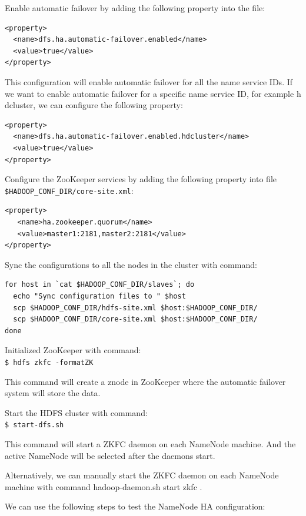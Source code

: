 Enable automatic failover by adding the following property into the file:
\lstset{style=bashstyle}
\begin{lstlisting}
<property>
  <name>dfs.ha.automatic-failover.enabled</name>
  <value>true</value>
</property>
\end{lstlisting}

This configuration will enable automatic failover for all the name service IDs. If we want to enable automatic failover for a specific name service ID, for example h
dcluster, we can configure the following property:
\lstset{style=bashstyle}
\begin{lstlisting}
<property>
  <name>dfs.ha.automatic-failover.enabled.hdcluster</name>
  <value>true</value>
</property>
\end{lstlisting}

Configure the ZooKeeper services by adding the following property into file \verb|$HADOOP_CONF_DIR/core-site.xml|:
\lstset{style=bashstyle}
\begin{lstlisting}
<property>
   <name>ha.zookeeper.quorum</name>
   <value>master1:2181,master2:2181</value>
</property>
\end{lstlisting}

Sync the configurations to all the nodes in the cluster with command:
\lstset{style=bashstyle}
\begin{lstlisting}
for host in `cat $HADOOP_CONF_DIR/slaves`; do
  echo "Sync configuration files to " $host
  scp $HADOOP_CONF_DIR/hdfs-site.xml $host:$HADOOP_CONF_DIR/
  scp $HADOOP_CONF_DIR/core-site.xml $host:$HADOOP_CONF_DIR/
done
\end{lstlisting}

Initialized ZooKeeper with command: \\
\verb|$ hdfs zkfc -formatZK|

This command will create a znode in ZooKeeper where the automatic failover system will store the data.

Start the HDFS cluster with command: \\
\verb|$ start-dfs.sh|

This command will start a ZKFC daemon on each NameNode machine. And the active NameNode will be selected after the daemons start.

Alternatively, we can manually start the ZKFC daemon on each NameNode machine with command hadoop-daemon.sh start zkfc .

We can use the following steps to test the NameNode HA configuration:

